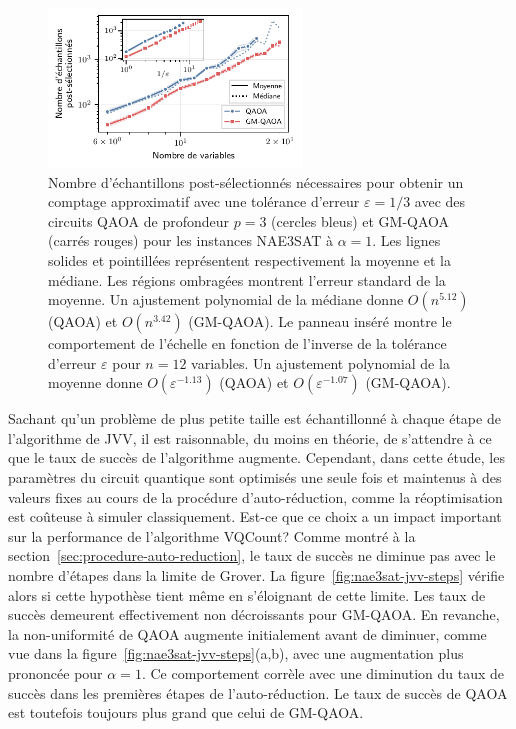 \begin{figure}[ht!]
    \centering
    \includegraphics[width=0.6\textwidth]{figures/nae3sat-scaling.pdf}
    \caption[Comportement d'échelle du nombre d'échantillons post-sélectionnés pour \#NAE3SAT]{Nombre d'échantillons post-sélectionnés nécessaires pour obtenir un comptage approximatif avec une tolérance d'erreur $\varepsilon=1/3$ avec des circuits QAOA de profondeur $p=3$ (cercles bleus) et GM-QAOA (carrés rouges) pour les instances NAE3SAT à $\alpha=1$. Les lignes solides et pointillées représentent respectivement la moyenne et la médiane. Les régions ombragées montrent l'erreur standard de la moyenne. Un ajustement polynomial de la médiane donne $O(n^{5.12})$ (QAOA) et $O(n^{3.42})$ (GM-QAOA). Le panneau inséré montre le comportement de l'échelle en fonction de l'inverse de la tolérance d'erreur $\varepsilon$ pour $n=12$ variables. Un ajustement polynomial de la moyenne donne $O(\varepsilon^{-1.13})$ (QAOA) et $O(\varepsilon^{-1.07})$ (GM-QAOA).}
    \label{fig:nae3sat-scaling}
\end{figure}

Sachant qu'un problème de plus petite taille est échantillonné à chaque étape de l'algorithme de JVV, il est raisonnable, du moins en théorie, de s'attendre à ce que le taux de succès de l'algorithme augmente. Cependant, dans cette étude, les paramètres du circuit quantique sont optimisés une seule fois et maintenus à des valeurs fixes au cours de la procédure d'auto-réduction, comme la réoptimisation est coûteuse à simuler classiquement. Est-ce que ce choix a un impact important sur la performance de l'algorithme VQCount? Comme montré à la section~\ref{sec:procedure-auto-reduction}, le taux de succès ne diminue pas avec le nombre d'étapes dans la limite de Grover. La figure~\ref{fig:nae3sat-jvv-steps} vérifie alors si cette hypothèse tient même en s'éloignant de cette limite. Les taux de succès demeurent effectivement non décroissants pour GM-QAOA. En revanche, la non-uniformité de QAOA augmente initialement avant de diminuer, comme vue dans la figure~\ref{fig:nae3sat-jvv-steps}(a,b), avec une augmentation plus prononcée pour $\alpha = 1$. Ce comportement corrèle avec une diminution du taux de succès dans les premières étapes de l'auto-réduction. Le taux de succès de QAOA est toutefois toujours plus grand que celui de GM-QAOA. 

